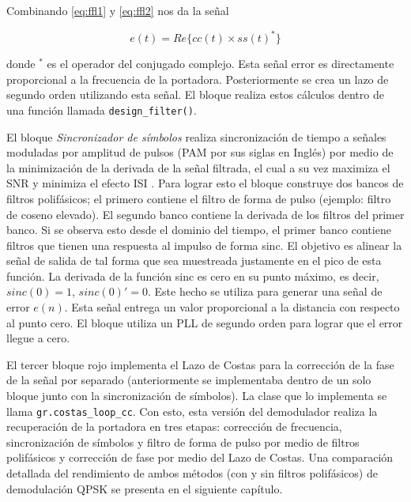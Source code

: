 Combinando \eqref{eq:ffl1} y \eqref{eq:ffl2} nos da la se\~nal

\begin{equation}
e(t)=Re\{cc(t) \times ss(t)^*\}
\end{equation}

donde $^*$ es el operador del conjugado complejo. Esta se\~nal error es directamente proporcional a la frecuencia de la
portadora. Posteriormente se crea un lazo de segundo orden utilizando esta se\~nal. El bloque realiza estos c\'alculos
dentro de una funci\'on llamada \verb|design_filter()|.

El bloque \emph{Sincronizador de s\'imbolos} realiza sincronizaci\'on de tiempo a se\~nales moduladas por amplitud de pulsos (PAM
por sus siglas en Ingl\'es) por medio de la minimizaci\'on de la derivada de la se\~nal filtrada, el cual a su vez maximiza el SNR
y minimiza el efecto ISI \cite{radio}. Para lograr esto el bloque construye dos bancos de filtros polif\'asicos; el primero
contiene el filtro de forma de pulso (ejemplo: filtro de coseno elevado). El segundo banco contiene la derivada de los filtros
del primer banco. Si se observa esto desde el dominio del tiempo, el primer banco contiene filtros que tienen una respuesta al
impulso de forma sinc. El objetivo es alinear la se\~nal de salida de tal forma que sea muestreada justamente en el pico de esta
funci\'on. La derivada de la funci\'on sinc es cero en su punto m\'aximo, es decir, $sinc(0)=1$, $sinc(0)'=0$. Este hecho se
utiliza para generar una se\~nal de error $e(n)$. Esta se\~nal entrega un valor proporcional a la distancia con respecto al punto cero.
El bloque utiliza un PLL de segundo orden para lograr que el error llegue a cero.

El tercer bloque rojo implementa el Lazo de Costas para la correcci\'on de la fase de la se\~nal por separado
(anteriormente se implementaba dentro de un solo bloque junto con la sincronizaci\'on de s\'imbolos). La clase que lo
implementa se llama \verb|gr.costas_loop_cc|. Con esto, esta versi\'on del demodulador realiza la recuperaci\'on de la
portadora en tres etapas: correcci\'on de frecuencia, sincronizaci\'on de s\'imbolos y filtro de forma de pulso por medio de
filtros polif\'asicos y correcci\'on de fase por medio del Lazo de Costas. Una comparaci\'on detallada del rendimiento de
ambos m\'etodos (con y sin filtros polif\'asicos) de demodulaci\'on QPSK se presenta en el siguiente cap\'itulo.
